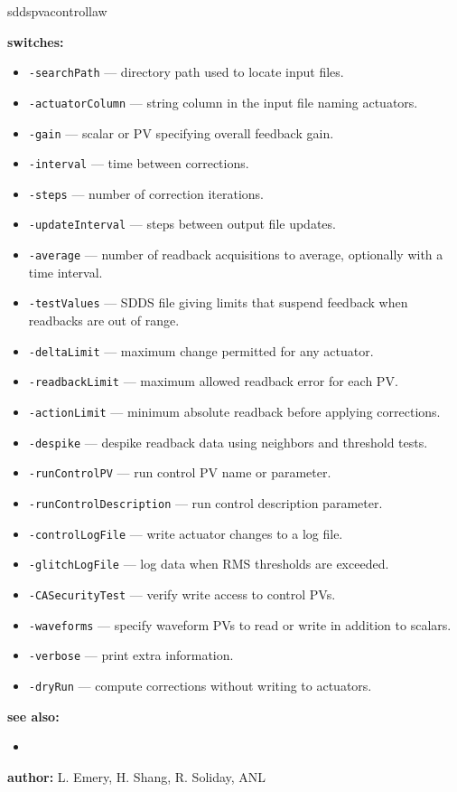 \begin{sddsprog}{sddspvacontrollaw}
\item \textbf{switches:}
\begin{itemize}
  \item {\tt -searchPath} --- directory path used to locate input files.
  \item {\tt -actuatorColumn} --- string column in the input file naming actuators.
  \item {\tt -gain} --- scalar or PV specifying overall feedback gain.
  \item {\tt -interval} --- time between corrections.
  \item {\tt -steps} --- number of correction iterations.
  \item {\tt -updateInterval} --- steps between output file updates.
  \item {\tt -average} --- number of readback acquisitions to average, optionally with a time interval.
  \item {\tt -testValues} --- SDDS file giving limits that suspend feedback when readbacks are out of range.
  \item {\tt -deltaLimit} --- maximum change permitted for any actuator.
  \item {\tt -readbackLimit} --- maximum allowed readback error for each PV.
  \item {\tt -actionLimit} --- minimum absolute readback before applying corrections.
  \item {\tt -despike} --- despike readback data using neighbors and threshold tests.
  \item {\tt -runControlPV} --- run control PV name or parameter.
  \item {\tt -runControlDescription} --- run control description parameter.
  \item {\tt -controlLogFile} --- write actuator changes to a log file.
  \item {\tt -glitchLogFile} --- log data when RMS thresholds are exceeded.
  \item {\tt -CASecurityTest} --- verify write access to control PVs.
  \item {\tt -waveforms} --- specify waveform PVs to read or write in addition to scalars.
  \item {\tt -verbose} --- print extra information.
  \item {\tt -dryRun} --- compute corrections without writing to actuators.
\end{itemize}

\item \textbf{see also:}
\begin{itemize}
  \item {}
\end{itemize}

\item \textbf{author:} L. Emery, H. Shang, R. Soliday, ANL
\end{sddsprog}
